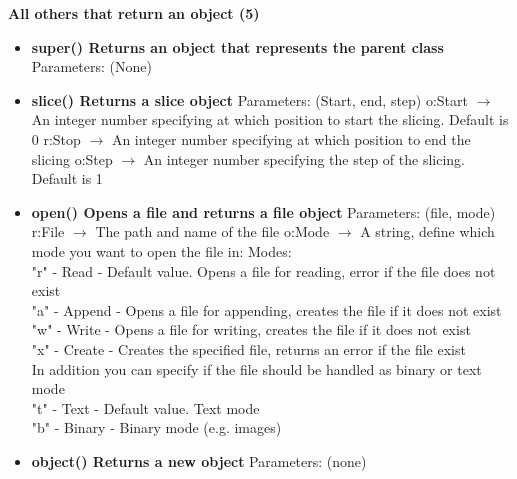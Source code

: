 \documentclass{report}
\begin{document}
      \begin{center}
        \textbf{All others that return an object (5)}
      \end{center}
      \begin{itemize}
        \item[\ding{43}] \textbf{super()	Returns an object that represents the parent class}
          \smallbreak \noindent
          Parameters: (None)
          \smallbreak \noindent
        \item[\ding{43}] \textbf{slice()	Returns a slice object}
          \smallbreak \noindent
          Parameters: (Start, end, step)
          \smallbreak \noindent
          o:Start $\rightarrow$ An integer number specifying at which position to start the slicing. Default is 0
          \smallbreak \noindent
          r:Stop $\rightarrow$ 	An integer number specifying at which position to end the slicing
          \smallbreak \noindent
          o:Step $\rightarrow$ An integer number specifying the step of the slicing. Default is 1
          \smallbreak \noindent
        \item[\ding{43}] \textbf{open()	Opens a file and returns a file object}
          \smallbreak \noindent
          Parameters: (file, mode)
          \smallbreak \noindent
          r:File $\rightarrow$ 	The path and name of the file
          \smallbreak \noindent
          o:Mode $\rightarrow$ A string, define which mode you want to open the file in:
          \smallbreak \noindent
          Modes:  \\
          "r" - Read - Default value. Opens a file for reading, error if the file does not exist \\
          "a" - Append - Opens a file for appending, creates the file if it does not exist \\
          "w" - Write - Opens a file for writing, creates the file if it does not exist \\
          "x" - Create - Creates the specified file, returns an error if the file exist \\
          In addition you can specify if the file should be handled as binary or text mode \\
          "t" - Text - Default value. Text mode \\
          "b" - Binary - Binary mode (e.g. images)
          \smallbreak \noindent
        \item[\ding{43}] \textbf{object()	Returns a new object}
          \smallbreak \noindent
          Parameters: (none)
          \smallbreak \noindent
      \end{itemize}
    
\end{document}
